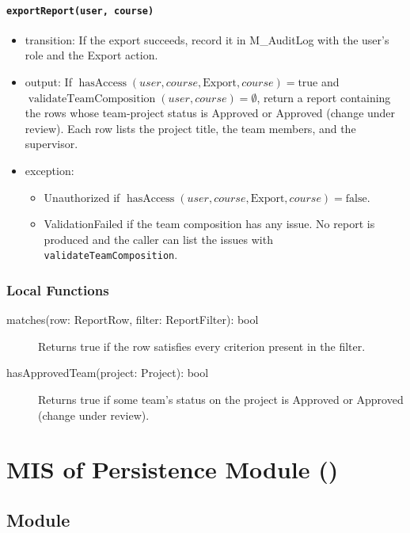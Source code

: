 \documentclass[12pt, titlepage]{article}
\newcommand{\moduleid}[1]{\texttt{\detokenize{#1}}}
\begin{document}
\paragraph{\texttt{exportReport(user, course)}}
\begin{itemize}
    \item transition: If the export succeeds, record it in M\_AuditLog with the user's role and the Export action.
    \item output: If $\operatorname{hasAccess}(user,course,\text{Export},course)=\text{true}$ and $\operatorname{validateTeamComposition}(user,course)=\emptyset$,
    return a report containing the rows whose team-project status is Approved or Approved (change under review).
    Each row lists the project title, the team members, and the supervisor.
    \item exception:
    \begin{itemize}
        \item Unauthorized if $\operatorname{hasAccess}(user,course,\text{Export},course)=\text{false}$.
        \item ValidationFailed if the team composition has any issue.
        No report is produced and the caller can list the issues with \texttt{validateTeamComposition}.
    \end{itemize}
\end{itemize}

\subsubsection{Local Functions}

\begin{description}
    \item[matches(row: ReportRow, filter: ReportFilter): bool] Returns true if the row satisfies every criterion present in the filter.
    \item[hasApprovedTeam(project: Project): bool] Returns true if some team's status on the project is Approved or Approved (change under review).
\end{description}

\newpage

\section[MIS of Persistence Module]{MIS of Persistence Module (\moduleid{M_Persistence})}
\label{M_Persistence}

\subsection{Module}
\end{document}
